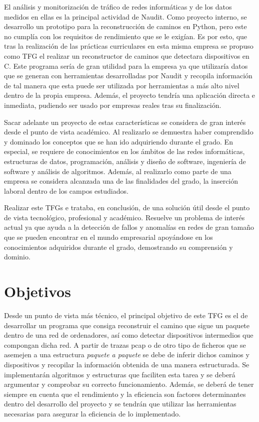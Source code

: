 \documentclass[tfg,epsbased,lof,lot,loa,final,nocopyright,overleaf]{tfgtfmthesisuam}
\begin{document}
El análisis y monitorización de tráfico de redes informáticas y de los datos medidos en ellas es la principal actividad de Naudit. Como proyecto interno, se desarrollo un prototipo para la reconstrucción de caminos en Python, pero este no cumplía con los requisitos de rendimiento que se le exigían. Es por esto, que tras la realización de las prácticas curriculares en esta misma empresa se propuso como TFG el realizar un reconstructor de caminos que detectara dispositivos en C. Este programa sería de gran utilidad para la empresa ya que utilizaría datos que se generan con herramientas desarrolladas por Naudit y recopila información de tal manera que esta puede ser utilizada por herramientas a más alto nivel dentro de la propia empresa. Además, el proyecto tendría una aplicación directa e inmediata, pudiendo ser usado por empresas reales tras su finalización.

Sacar adelante un proyecto de estas características se considera de gran interés desde el punto de vista académico. Al realizarlo se demuestra haber comprendido y dominado los conceptos que se han ido adquiriendo durante el grado. En especial, se requiere de conocimientos en los ámbitos de las redes informáticas, estructuras de datos, programación, análisis y diseño de software, ingeniería de software y análisis de algoritmos. Además, al realizarlo como parte de una empresa se considera alcanzada una de las finalidades del grado, la inserción laboral dentro de los campos estudiados.

Realizar este TFGs e trataba, en conclusión, de una solución útil desde el punto de vista tecnológico, profesional y académico. Resuelve un problema de interés actual ya que ayuda a la detección de fallos y anomalías en redes de gran tamaño que se pueden encontrar en el mundo empresarial apoyándose en los conocimientos adquiridos durante el grado, demostrando su comprensión y dominio. 
\section{Objetivos}
Desde un punto de vista más técnico, el principal objetivo de este TFG es el de desarrollar un programa que consiga reconstruir el camino que sigue un paquete dentro de una red de ordenadores, así como detectar dispositivos intermedios que compongan dicha red. A partir de trazas pcap o de otro tipo de ficheros que se asemejen a una estructura \textit{paquete a paquete} se debe de inferir dichos caminos y dispositivos y recopilar la información obtenida de una manera estructurada. Se implementarán algoritmos y estructuras que faciliten esta tarea y se deberá argumentar y comprobar su correcto funcionamiento. Además, se deberá de tener siempre en cuenta que el rendimiento y la eficiencia son factores determinantes dentro del desarrollo del proyecto y se tendrán que utilizar las herramientas necesarias para asegurar la eficiencia de lo implementado.
\end{document}
